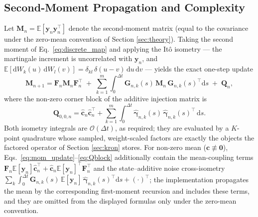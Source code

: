 \documentclass[preprint,12pt]{elsarticle}
\begin{document}
\subsection{Second-Moment Propagation and Complexity}
Let $\mathbf{M}_n = \mathbb{E}[\mathbf{y}_n \mathbf{y}_n^\top]$ denote the second-moment matrix (equal to the covariance under the zero-mean convention of Section \ref{sec:theory}). Taking the second moment of Eq.~\eqref{eq:discrete_map} and applying the It\^o isometry --- the martingale increment is uncorrelated with $\mathbf{y}_n$, and $\mathbb{E}[\mathrm{d}W_k(u)\,\mathrm{d}W_l(v)] = \delta_{kl}\,\delta(u-v)\,\mathrm{d}u\,\mathrm{d}v$ --- yields the exact one-step update
\begin{equation}
\label{eq:mom_update}
\mathbf{M}_{n+1} = \mathbf{F}_n \mathbf{M}_n \mathbf{F}_n^\top \;+\; \sum_{k=1}^m \int_0^{\Delta t} \mathbf{G}_{n,k}(s)\, \mathbf{M}_n\, \mathbf{G}_{n,k}(s)^\top \mathrm{d}s \;+\; \mathbf{Q}_n,
\end{equation}
where the non-zero corner block of the additive injection matrix is
\begin{equation}
\label{eq:Qblock}
\mathbf{Q}_{0,0,n} = \hat{\mathbf{c}}_n \hat{\mathbf{c}}_n^\top + \sum_{k=1}^m \int_0^{\Delta t} \hat{\boldsymbol{\gamma}}_{n,k}(s)\, \hat{\boldsymbol{\gamma}}_{n,k}(s)^\top\, \mathrm{d}s .
\end{equation}
Both isometry integrals are $\mathcal{O}(\Delta t)$, as required; they are evaluated by a $K$-point quadrature whose sampled, weight-scaled factors are exactly the objects the factored operator of Section \ref{sec:kron} stores. For non-zero mean ($\mathbf{c} \not\equiv \mathbf{0}$), Eqs.~\eqref{eq:mom_update}--\eqref{eq:Qblock} additionally contain the mean-coupling terms $\mathbf{F}_n \mathbb{E}[\mathbf{y}_n] \hat{\mathbf{c}}_n^\top + \hat{\mathbf{c}}_n \mathbb{E}[\mathbf{y}_n]^\top \mathbf{F}_n^\top$ and the state--additive noise cross-isometry $\sum_k \int_0^{\Delta t} \mathbf{G}_{n,k}(s)\,\mathbb{E}[\mathbf{y}_n]\, \hat{\boldsymbol\gamma}_{n,k}(s)^\top \mathrm{d}s + (\cdot)^\top$; the implementation propagates the mean by the corresponding first-moment recursion and includes these terms, and they are omitted from the displayed formulas only under the zero-mean convention.
\end{document}
